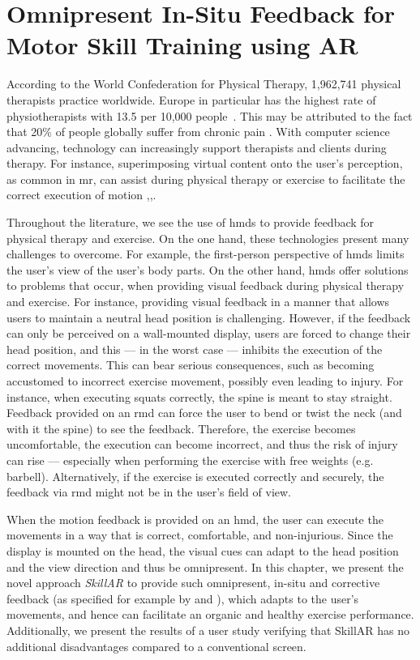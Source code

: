 \chapter{Omnipresent In-Situ Feedback for Motor Skill Training using AR \label{chap:omnipresent}}
According to the World Confederation for Physical Therapy, 1,962,741 physical therapists practice worldwide. Europe in particular has the highest rate of physiotherapists with 13.5 per 10,000 people~\cite{worldphysiotherapy2023global}. This may be attributed to the fact that 20\% of people globally suffer from chronic pain \cite{treede2015classification}. With computer science advancing, technology can increasingly support therapists and clients during therapy. For instance, superimposing virtual content onto the user's perception, as common in \acrshort{mr}, can assist during physical therapy or exercise to facilitate the correct execution of motion \cite{brepohl2023virtual},\cite{campo2021immersive},\cite{diller2022vcb}.

Throughout the literature, we see the use of \acrshort{hmd}s to provide feedback for physical therapy and exercise. On the one hand, these technologies present many challenges to overcome. For example, the first-person perspective of \acrshort{hmd}s limits the user’s view of the user's body parts. On the other hand, \acrshort{hmd}s offer solutions to problems that occur, when providing visual feedback during physical therapy and exercise. For instance, providing visual feedback in a manner that allows users to maintain a neutral head position is challenging. However, if the feedback can only be perceived on a wall-mounted display, users are forced to change their head position, and this --- in the worst case --- inhibits the execution of the correct movements. This can bear serious consequences, such as becoming accustomed to incorrect exercise movement, possibly even leading to injury. For instance, when executing squats correctly, the spine is meant to stay straight. Feedback provided on an \acrshort{rmd} can force the user to bend or twist the neck (and with it the spine) to see the feedback. Therefore, the exercise becomes uncomfortable, the execution can become incorrect, and thus the risk of injury can rise --- especially when performing the exercise with free weights (e.g. barbell). Alternatively, if the exercise is executed correctly and securely, the feedback via \acrshort{rmd} might not be in the user's field of view.

When the motion feedback is provided on an \acrshort{hmd}, the user can execute the movements in a way that is correct, comfortable, and non-injurious. Since the display is mounted on the head, the visual cues can adapt to the head position and the view direction and thus be omnipresent. In this chapter, we present the novel approach \emph{SkillAR} to provide such omnipresent, in-situ and corrective feedback (as specified for example by \cite{hattie:2007:Feedback} and \cite{Lysakowski:1982:Feedback}), which adapts to the user's movements, and hence can facilitate an organic and healthy exercise performance. Additionally, we present the results of a user study verifying that SkillAR has no additional disadvantages compared to a conventional screen.

